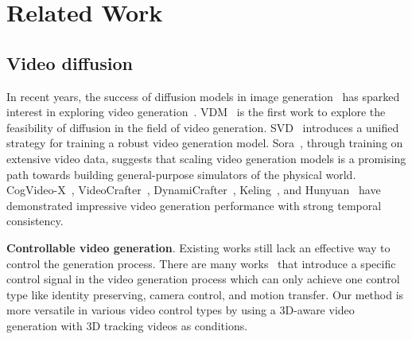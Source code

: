 \section{Related Work}

\subsection{Video diffusion}

In recent years, the success of diffusion models in image generation~\cite{ho2020denoising, rombach2022high, peebles2023scalable} has sparked interest in exploring video generation~\cite{ho2022video, he2022latent, blattmann2023stable, chen2023videocrafter1, chen2024videocrafter2, brooks2024video, yang2024cogvideox, keling, kong2024hunyuanvideo, lin2024open, opensora, xing2025dynamicrafter,guo2023animatediff}. VDM~\cite{ho2022video} is the first work to explore the feasibility of diffusion in the field of video generation. SVD~\cite{blattmann2023stable} introduces a unified strategy for training a robust video generation model. Sora~\cite{brooks2024video}, through training on extensive video data, suggests that scaling video generation models is a promising path towards building general-purpose simulators of the physical world. CogVideo-X~\cite{yang2024cogvideox}, 
VideoCrafter~\cite{chen2023videocrafter1,chen2024videocrafter2}, DynamiCrafter~\cite{xing2025dynamicrafter},  Keling~\cite{keling}, and Hunyuan~\cite{kong2024hunyuanvideo} have demonstrated impressive video generation performance with strong temporal consistency. 


\textbf{Controllable video generation}. Existing works still lack an effective way to control the generation process. 
There are many works~\cite{wang2024motionctrl,he2024cameractrl,polyak2024movie,he2024id,yuan2024identity,wang2024boximator,huang2023fine,guo2024sparsectrl,namekata2024sg,ma2024trailblazer,ma2024follow,yu2024viewcrafter,ma2024follow,qiu2024freetraj} that introduce a specific control signal in the video generation process which can only achieve one control type like identity preserving, camera control, and motion transfer. 
Our method is more versatile in various video control types by using a 3D-aware video generation with 3D tracking videos as conditions.


